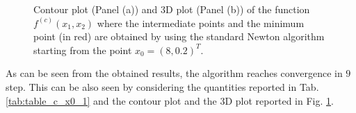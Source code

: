 \documentclass[a4paper,11pt]{article}
\begin{document}
	\begin{figure}[H]
		\centering
		 \quad
		\caption{Contour plot (Panel (a)) and 3D plot (Panel (b)) of the function $f^{(c)}(x_{1},x_{2})$ where the intermediate points and the minimum point (in red) are obtained by using the standard Newton algorithm starting from the point $x_{0}=(8,0.2)^{T}$.}
		\label{Fig:func_c}
	\end{figure}

	\noindent As can be seen from the obtained results, the algorithm reaches convergence in $9$ step. This can be also seen by considering the quantities reported in Tab. \ref{tab:table_c_x0_1} and the contour plot and the 3D plot reported in Fig. \ref{Fig:func_c}.\\
	
\end{document}
